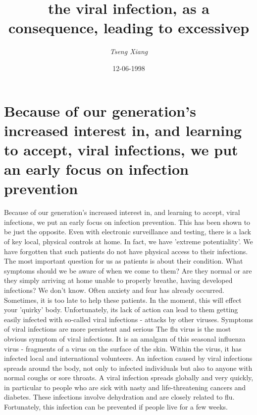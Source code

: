 \documentclass{article}%
\title{the viral infection, as a consequence, leading to excessivep}%
\author{\textit{Tseng Xiang}}%
\date{12-06-1998}%
\begin{document}
%
\normalsize%
\maketitle%
\section{Because of our generation's increased interest in, and learning to accept, viral infections, we put an early focus on infection prevention}%
\label{sec:Becauseofourgenerationsincreasedinterestin,andlearningtoaccept,viralinfections,weputanearlyfocusoninfectionprevention}%
Because of our generation's increased interest in, and learning to accept, viral infections, we put an early focus on infection prevention.\newline%
This has been shown to be just the opposite. Even with electronic surveillance and testing, there is a lack of key local, physical controls at home. In fact, we have 'extreme potentiality'. We have forgotten that such patients do not have physical access to their infections.\newline%
The most important question for us as patients is about their condition. What symptoms should we be aware of when we come to them? Are they normal or are they simply arriving at home unable to properly breathe, having developed infections? We don't know.\newline%
Often anxiety and fear has already occurred. Sometimes, it is too late to help these patients. In the moment, this will effect your 'quirky' body. Unfortunately, its lack of action can lead to them getting easily infected with so{-}called viral infections {-} attacks by other viruses.\newline%
Symptoms of viral infections are more persistent and serious\newline%
The flu virus is the most obvious symptom of viral infections. It is an amalgam of this seasonal influenza virus {-} fragments of a virus on the surface of the skin. Within the virus, it has infected local and international volunteers.\newline%
An infection caused by viral infections spreads around the body, not only to infected individuals but also to anyone with normal coughs or sore throats. A viral infection spreads globally and very quickly, in particular to people who are sick with nasty and life{-}threatening cancers and diabetes. These infections involve dehydration and are closely related to flu. Fortunately, this infection can be prevented if people live for a few weeks.\newline%
\end{document}
